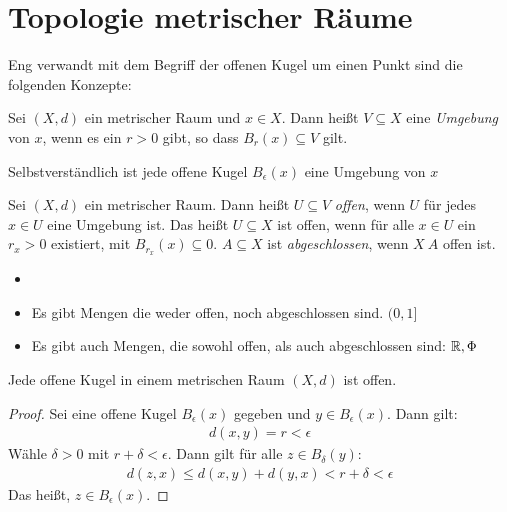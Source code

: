 \section{Topologie metrischer Räume}
Eng verwandt mit dem Begriff der offenen Kugel um einen Punkt sind die folgenden 
Konzepte:

\begin{Definition}{%
	Sei $(X,d)$ ein metrischer Raum und $x \in X$. Dann heißt $V \subseteq X$ eine 
	\emph{Umgebung} von $x$, wenn es ein $r > 0$ gibt, so dass $B_r(x) \subseteq V$ 
	gilt.
}\end{Definition}

\begin{Beispiel}{
	Selbstverständlich ist jede offene Kugel $B_\epsilon(x)$ eine Umgebung von $x$
}\end{Beispiel}

\begin{Definition}{%
	Sei $(X,d)$ ein metrischer Raum. Dann heißt $U \subseteq V$ \emph{offen}, wenn 
	$U$ für jedes $x \in U$ eine Umgebung ist.
	Das heißt $U \subseteq X$ ist offen, wenn für alle $x \in U$ ein $r_x > 0$ 
	existiert, mit $B_{r_x}(x) \subseteq 0$. 
	$A \subseteq X$ ist \emph{abgeschlossen}, wenn $X \ A$ offen ist. 
}\end{Definition}

\begin{Bemerkung}{
	\begin{itemize}
		\item[ ]
		\item Es gibt Mengen die weder offen, noch abgeschlossen sind. $(0,1]$
		\item Es gibt auch Mengen, die sowohl offen, als auch abgeschlossen sind:
		$\mathbb{R}, \Phi$
	\end{itemize}
}\end{Bemerkung}

\begin{Lemma}{%
	Jede offene Kugel in einem metrischen Raum $(X,d)$ ist offen.
}\end{Lemma}

\begin{proof}
	Sei eine offene Kugel $B_\epsilon(x)$ gegeben und $y \in B_\epsilon(x)$. 
	Dann gilt:
	\begin{align*}
		d(x,y) = r < \epsilon
	\end{align*}
	Wähle $\delta > 0$ mit $r + \delta < \epsilon$. Dann gilt für alle 
	$z \in B_\delta (y)$:
	\begin{align*}
		d(z,x) \leq d(x,y) + d(y,x) < r + \delta < \epsilon
	\end{align*}
	Das heißt, $z \in B_\epsilon(x)$.
\end{proof}